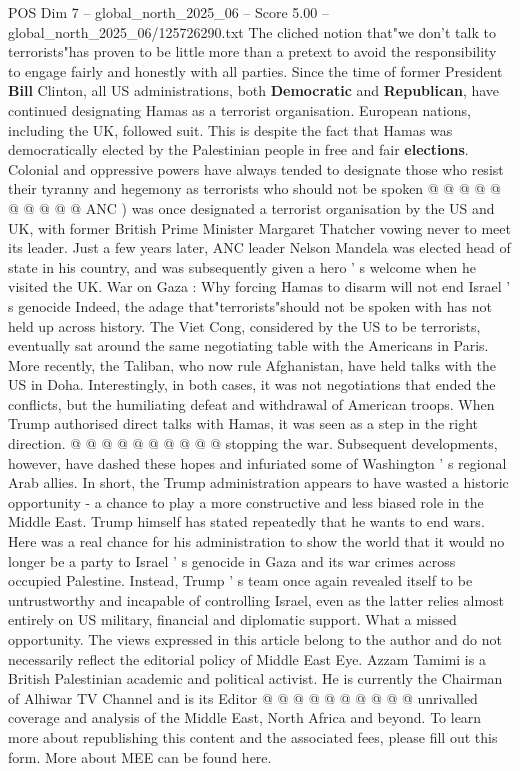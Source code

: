 \begin{textsample}{POS Dim 7 – global\_north\_2025\_06 – Score 5.00 – global\_north\_2025\_06/125726290.txt}
The cliched notion that"we don't talk to terrorists"has proven to be little more than a pretext to avoid the responsibility to engage fairly and honestly with all parties.
Since the time of former President \textbf{Bill} Clinton, all US administrations, both \textbf{Democratic} and \textbf{Republican}, have continued designating Hamas as a terrorist organisation.
European nations, including the UK, followed suit.
This is despite the fact that Hamas was democratically elected by the Palestinian people in free and fair \textbf{elections}.
Colonial and oppressive powers have always tended to designate those who resist their tyranny and hegemony as terrorists who should not be spoken @ @ @ @ @ @ @ @ @ @ ANC ) was once designated a terrorist organisation by the US and UK, with former British Prime Minister Margaret Thatcher vowing never to meet its leader.
Just a few years later, ANC leader Nelson Mandela was elected head of state in his country, and was subsequently given a hero ' s welcome when he visited the UK.
War on Gaza : Why forcing Hamas to disarm will not end Israel ' s genocide Indeed, the adage that"terrorists"should not be spoken with has not held up across history.
The Viet Cong, considered by the US to be terrorists, eventually sat around the same negotiating table with the Americans in Paris.
More recently, the Taliban, who now rule Afghanistan, have held talks with the US in Doha.
Interestingly, in both cases, it was not negotiations that ended the conflicts, but the humiliating defeat and withdrawal of American troops.
When Trump authorised direct talks with Hamas, it was seen as a step in the right direction. @ @ @ @ @ @ @ @ @ @ stopping the war.
Subsequent developments, however, have dashed these hopes and infuriated some of Washington ' s regional Arab allies.
In short, the Trump administration appears to have wasted a historic opportunity - a chance to play a more constructive and less biased role in the Middle East.
Trump himself has stated repeatedly that he wants to end wars.
Here was a real chance for his administration to show the world that it would no longer be a party to Israel ' s genocide in Gaza and its war crimes across occupied Palestine.
Instead, Trump ' s team once again revealed itself to be untrustworthy and incapable of controlling Israel, even as the latter relies almost entirely on US military, financial and diplomatic support.
What a missed opportunity.
The views expressed in this article belong to the author and do not necessarily reflect the editorial policy of Middle East Eye.
Azzam Tamimi is a British Palestinian academic and political activist.
He is currently the Chairman of Alhiwar TV Channel and is its Editor @ @ @ @ @ @ @ @ @ @ unrivalled coverage and analysis of the Middle East, North Africa and beyond.
To learn more about republishing this content and the associated fees, please fill out this form.
More about MEE can be found here.

\end{textsample}

